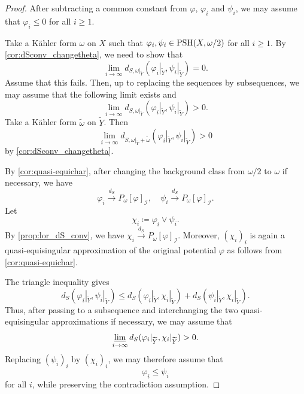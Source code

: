 \begin{proof}
After subtracting a common constant from $\varphi$, $\varphi_i$ and $\psi_i$, we may assume that $\varphi_i\leq 0$ for all $i\geq 1$.

Take a K\"ahler form $\omega$ on $X$ such that $\varphi_i,\psi_i\in \mathrm{PSH}(X,\omega/2)$ for all $i\geq 1$. By \cref{cor:dSconv_changetheta}, we need to show that
\[
\lim_{i\to\infty} d_{S,\omega|_{\widetilde{Y}}}\left(\varphi_i|_{\widetilde{Y}},\psi_i|_{\widetilde{Y}}\right)=0.
\]
Assume that this fails. Then, up to replacing the sequences by subsequences, we may assume that the following limit exists and
\[
\lim_{i\to\infty} d_{S,\omega|_{\widetilde{Y}}}\left(\varphi_i|_{\widetilde{Y}},\psi_i|_{\widetilde{Y}}\right)>0.
\]
Take a K\"ahler form $\tilde{\omega}$ on $\widetilde{Y}$. Then
\[
\lim_{i\to\infty} d_{S,\omega|_{\widetilde{Y}}+\tilde{\omega}}\left(\varphi_i|_{\widetilde{Y}},\psi_i|_{\widetilde{Y}}\right)>0
\]
by \cref{cor:dSconv_changetheta}.

By \cref{cor:quasi-equichar}, after changing the background class from $\omega/2$ to $\omega$ if necessary, we have
\[
    \varphi_i\xrightarrow{d_S}P_{\omega}[\varphi]_{\mathcal I},\quad \psi_i\xrightarrow{d_S}P_{\omega}[\varphi]_{\mathcal I}.
\]
Let
\[
    \chi_i\coloneqq \varphi_i\lor\psi_i.
\]
By \cref{prop:lor_dS_conv}, we have $\chi_i\xrightarrow{d_S} P_{\omega}[\varphi]_{\mathcal{I}}$. Moreover, $(\chi_i)_i$ is again a quasi-equisingular approximation of the original potential $\varphi$ as follows from \cref{cor:quasi-equichar}.

The triangle inequality gives
\[
d_S(\varphi_i|_{\widetilde{Y}},\psi_i|_{\widetilde{Y}}) \leq  d_S(\varphi_i|_{\widetilde{Y}},\chi_i|_{\widetilde{Y}})+ d_S(\psi_i|_{\widetilde{Y}},\chi_i|_{\widetilde{Y}}).
\]
Thus, after passing to a subsequence and interchanging the two quasi-equisingular approximations if necessary, we may assume that
\[
    \varliminf_{i\to\infty}d_S(\varphi_i|_{\widetilde{Y}},\chi_i|_{\widetilde{Y}})>0.
\]
Replacing $(\psi_i)_i$ by $(\chi_i)_i$, we may therefore assume that
\[
    \varphi_i\leq \psi_i
\]
for all $i$, while preserving the contradiction assumption.




\end{proof}
